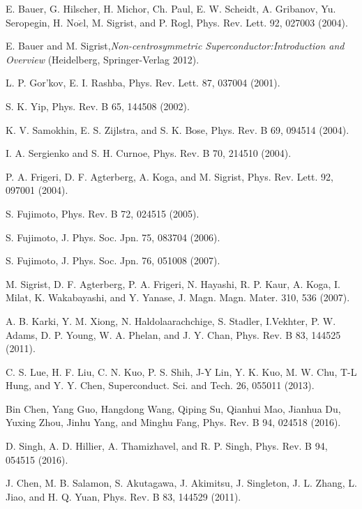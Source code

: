 \documentclass[reprint, superscriptaddress, secnumarabic, amssymb, nobibnotes, aps, prl]{revtex4-1}
\begin{document}
\begin{thebibliography}{References}

 E. Bauer, G. Hilscher, H. Michor, Ch. Paul, E. W. Scheidt, A. Gribanov, Yu. Seropegin, H. No$\ddot{e}$l, M. Sigrist, and P. Rogl, Phys. Rev. Lett. 92, 027003 (2004).

 E. Bauer and M. Sigrist,\textit {Non-centrosymmetric Superconductor:Introduction and Overview} (Heidelberg, Springer-Verlag 2012).

 L. P. Gor'kov, E. I. Rashba, Phys. Rev. Lett. 87, 037004 (2001).

 S. K. Yip, Phys. Rev. B 65, 144508 (2002).

 K. V. Samokhin, E. S. Zijlstra, and S. K. Bose, Phys. Rev. B 69, 094514 (2004).

 I. A. Sergienko and S. H. Curnoe, Phys. Rev. B 70, 214510 (2004).

 P. A. Frigeri, D. F. Agterberg, A. Koga, and M. Sigrist, Phys. Rev. Lett. 92, 097001 (2004).

 S. Fujimoto, Phys. Rev. B 72, 024515 (2005).

 S. Fujimoto, J. Phys. Soc. Jpn. 75, 083704 (2006).

 S. Fujimoto, J. Phys. Soc. Jpn. 76, 051008 (2007).

 M. Sigrist, D. F. Agterberg, P. A. Frigeri, N. Hayashi, R. P. Kaur, A. Koga, I. Milat, K. Wakabayashi, and Y. Yanase,
J. Magn. Magn. Mater. 310, 536 (2007).

 A. B. Karki, Y. M. Xiong, N. Haldolaarachchige, S. Stadler, I.Vekhter, P. W. Adams, D. P. Young, W. A. Phelan, and J. Y. Chan, Phys. Rev. B 83, 144525 (2011).

 C. S. Lue, H. F. Liu, C. N. Kuo, P. S. Shih, J-Y Lin, Y. K. Kuo, M. W. Chu, T-L Hung, and Y. Y. Chen, Superconduct. Sci. and Tech. 26, 055011 (2013).

 Bin Chen, Yang Guo, Hangdong Wang, Qiping Su, Qianhui Mao, Jianhua Du, Yuxing Zhou, Jinhu Yang, and Minghu Fang, Phys. Rev. B 94, 024518 (2016).

 D. Singh, A. D. Hillier, A. Thamizhavel, and R. P. Singh, Phys. Rev. B 94, 054515 (2016).

 J. Chen, M. B. Salamon, S. Akutagawa, J. Akimitsu, J. Singleton, J. L. Zhang, L. Jiao, and H. Q. Yuan, Phys. Rev. B 83, 144529 (2011).


\end{thebibliography}
\end{document}
